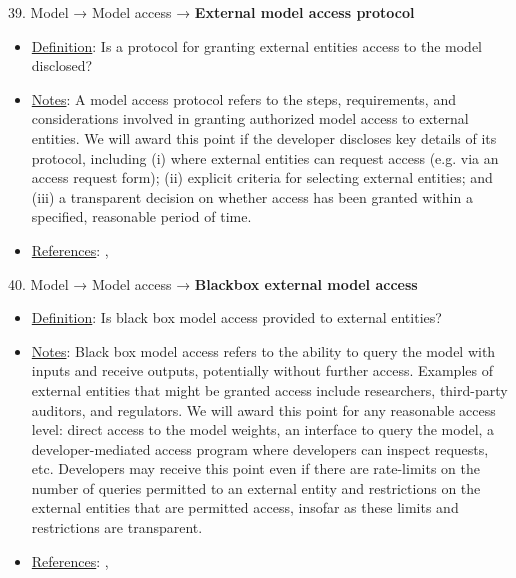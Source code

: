 39. Model → Model access → \textbf{External model access protocol}
\vspace{-\parskip}
\begin{itemize}
\item
\underline{Definition}: Is a protocol for granting external entities access to the model disclosed?
\item
\underline{Notes}: A model access protocol refers to the steps, requirements, and considerations involved in granting authorized model access to external entities. We will award this point if the developer discloses key details of its protocol, including (i) where external entities can request access (e.g. via an access request form); (ii) explicit criteria for selecting external entities; and (iii) a transparent decision on whether access has been granted within a specified, reasonable period of time.
\item
\underline{References}: \citet{solaiman2023gradient}, \citet{shevlane2022structured}
\end{itemize} \vspace{\baselineskip}


40. Model → Model access → \textbf{Blackbox external model access}
\vspace{-\parskip}
\begin{itemize}
\item
\underline{Definition}: Is black box model access provided to external entities?
\item
\underline{Notes}: Black box model access refers to the ability to query the model with inputs and receive outputs, potentially without further access. Examples of external entities that might be granted access include researchers, third-party auditors, and regulators. We will award this point for any reasonable access level: direct access to the model weights, an interface to query the model, a developer-mediated access program where developers can inspect requests, etc. Developers may receive this point even if there are rate-limits on the number of queries permitted to an external entity and restrictions on the external entities that are permitted access, insofar as these limits and restrictions are transparent.
\item
\underline{References}: \citet{solaiman2023gradient}, \citet{shevlane2022structured}
\end{itemize} \vspace{\baselineskip}


